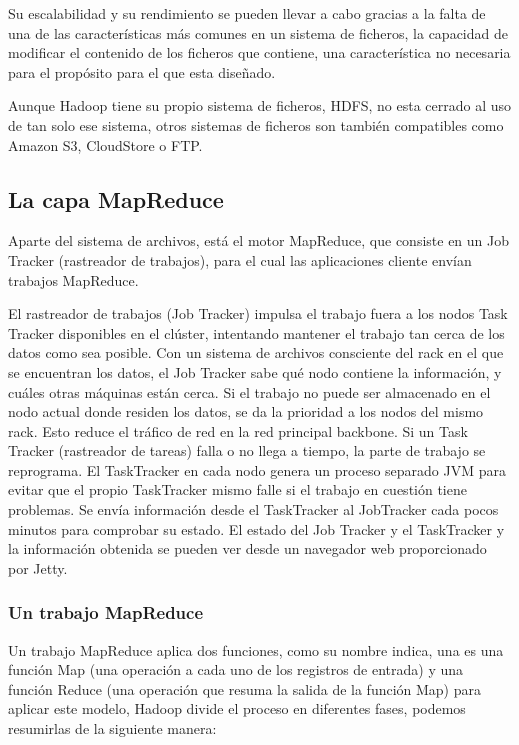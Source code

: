 Su escalabilidad y su rendimiento se pueden llevar a cabo gracias a la falta de una de las características m\'as comunes en un sistema de ficheros, la capacidad de modificar el contenido de los ficheros que contiene, una característica no necesaria para el propósito para el que esta dise\~nado.

Aunque Hadoop tiene su propio sistema de ficheros, HDFS, no esta cerrado al uso de tan solo ese sistema, otros sistemas de ficheros son también compatibles como Amazon S3, CloudStore o FTP.

\subsection{La capa MapReduce}

Aparte del sistema de archivos, está el motor MapReduce, que consiste en un Job Tracker (rastreador de trabajos), para el cual las aplicaciones cliente envían trabajos MapReduce.

El rastreador de trabajos (Job Tracker) impulsa el trabajo fuera a los nodos Task Tracker disponibles en el clúster, intentando mantener el trabajo tan cerca de los datos como sea posible. Con un sistema de archivos consciente del rack en el que se encuentran los datos, el Job Tracker sabe qué nodo contiene la información, y cuáles otras máquinas están cerca. Si el trabajo no puede ser almacenado en el nodo actual donde residen los datos, se da la prioridad a los nodos del mismo rack. Esto reduce el tráfico de red en la red principal backbone. Si un Task Tracker (rastreador de tareas) falla o no llega a tiempo, la parte de trabajo se reprograma. El TaskTracker en cada nodo genera un proceso separado JVM para evitar que el propio TaskTracker mismo falle si el trabajo en cuestión tiene problemas. Se envía información desde el TaskTracker al JobTracker cada pocos minutos para comprobar su estado. El estado del Job Tracker y el TaskTracker y la información obtenida se pueden ver desde un navegador web proporcionado por Jetty.

\subsubsection{Un trabajo MapReduce}


Un trabajo MapReduce aplica dos funciones, como su nombre indica, una es una función Map (una operación a cada uno de los registros de entrada) y una función Reduce (una operación que resuma la salida de la función Map) para aplicar este modelo, Hadoop divide el proceso en diferentes fases, podemos resumirlas de la siguiente manera:

